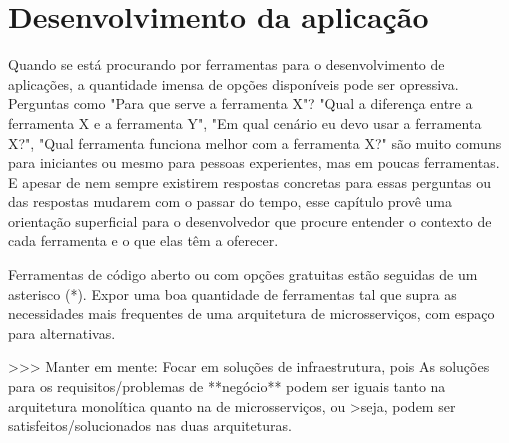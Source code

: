 \chapter{Desenvolvimento da aplicação}\label{chapter-ferramentas}



Quando se está procurando por ferramentas para o desenvolvimento de aplicações, a quantidade imensa de opções disponíveis pode ser opressiva. Perguntas como "Para que serve a ferramenta X"? "Qual a diferença entre a ferramenta X e a ferramenta Y", "Em qual cenário eu devo usar a ferramenta X?", "Qual ferramenta funciona melhor com a ferramenta X?" são muito comuns para iniciantes ou mesmo para pessoas experientes, mas em poucas ferramentas. E apesar de nem sempre existirem respostas concretas para essas perguntas ou das respostas mudarem com o passar do tempo, esse capítulo provê uma orientação superficial para o desenvolvedor que procure entender o contexto de cada ferramenta e o que elas têm a oferecer.

Ferramentas de código aberto ou com opções gratuitas estão seguidas de um asterisco (*).
Expor uma boa quantidade de ferramentas tal que supra as necessidades mais frequentes de uma arquitetura de microsserviços, com espaço para alternativas.

>>> Manter em mente: Focar em soluções de infraestrutura, pois As soluções para os requisitos/problemas de **negócio** podem ser iguais tanto na arquitetura monolítica quanto na de microsserviços, ou >seja, podem ser satisfeitos/solucionados nas duas arquiteturas.

